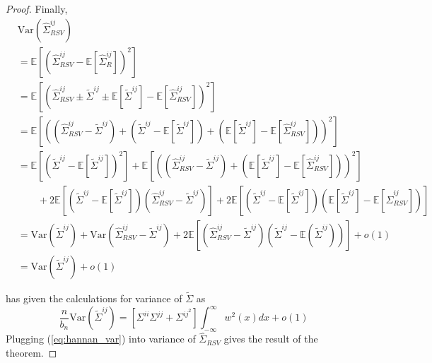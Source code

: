 \documentclass[12pt]{article}
\newcommand{\E}{\mathbb{E}}
\newcommand{\Var}{\text{Var}}
\begin{document}
\begin{proof}
Finally,
\begin{align*}
 & \Var\left(\hat{\Sigma}_{RSV}^{ij} \right)\\
  & = \E \left[ \left(\hat{\Sigma}_{RSV}^{ij}  - \E \left[\hat{\Sigma}_{R}^{ij}  \right] \right)^2 \right]\\
& = \E \left[ \left(\hat{\Sigma}_{RSV}^{ij} \pm \tilde{\Sigma}^{ij} \pm \E \left[ \tilde{\Sigma}^{ij}\right] - \E \left[\hat{\Sigma}_{RSV}^{ij}  \right] \right)^2 \right]\\
& = \E\left[ \left( \left(\hat{\Sigma}_{RSV}^{ij} - \tilde{\Sigma}^{ij} \right) + \left(\tilde{\Sigma}^{ij}  - \E\left[\tilde{\Sigma}^{ij}\right]\right) + \left(\E\left[\tilde{\Sigma}^{ij}\right] - \E \left[\hat{\Sigma}_{RSV}^{ij}  \right] \right)  \right)^2 \right] \\ 
& =  \E\left[ \left(\tilde{\Sigma}^{ij}  - \E\left[\tilde{\Sigma}^{ij}\right]\right)^2 \right] + \E \left[ \left(\left(\hat{\Sigma}_{RSV}^{ij} - \tilde{\Sigma}^{ij} \right) + \left(\E\left[\tilde{\Sigma}^{ij}\right] - \E \left[\hat{\Sigma}_{RSV}^{ij}  \right] \right) \right)^2 \right] \\
& \quad \quad + 2\E\left[\left(\tilde{\Sigma}^{ij}  - \E\left[\tilde{\Sigma}^{ij}\right]\right) \left(\hat{\Sigma}_{RSV}^{ij} - \tilde{\Sigma}^{ij} \right)\right] + 2 \E\left[\left(\tilde{\Sigma}^{ij}  - \E\left[\tilde{\Sigma}^{ij}\right]\right) \left(\E \left[\tilde{\Sigma}^{ij}\right] - \E \left[\hat{\Sigma}_{RSV}^{ij}  \right] \right)\right]\\
& = \Var\left( \tilde{\Sigma}^{ij}\right) + \Var\left(\hat{\Sigma}_{RSV}^{ij} - \tilde{\Sigma}^{ij} \right) + 2 \E\left[ \left(\hat{\Sigma}_{RSV}^{ij} -  \tilde{\Sigma}^{ij} \right) \left(\tilde{\Sigma}^{ij}  - \E \left( \tilde{\Sigma}^{ij} \right) \right) \right] + o(1)\\
& = \Var\left( \tilde{\Sigma}^{ij}\right) + o(1)
\end{align*}

\cite{hannan2009multiple} has given the calculations for variance of $\tilde{\Sigma}$ as 
\begin{equation} \label{eq:hannan_var}
\dfrac{n}{b_n}\Var(\tilde{\Sigma}^{ij}) = [\Sigma^{ii}\Sigma^{jj} + \Sigma^{ij}^2]\int_{-\infty}^{\infty}w^2(x)dx + o(1)    
\end{equation}
Plugging (\ref{eq:hannan_var}) into variance of $\hat{\Sigma}_{RSV}$ gives the result of the theorem.
 
\end{proof}




\end{document}
